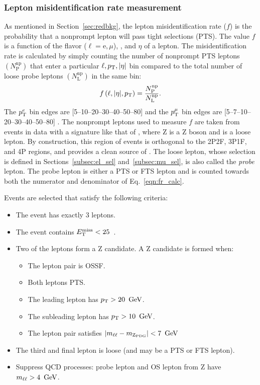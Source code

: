 \subsubsection{Lepton misidentification rate measurement}
\label{subsubsec:fr_evtsel}
As mentioned in Section~\ref{sec:redbkg}, the lepton misidentification rate ($f$) is the probability that a nonprompt lepton will pass tight selections (PTS).
The value $f$ is a function of the flavor ($\ell = \mathrm{e}, \mu$), \pt, and $\eta$ of a lepton.
The misidentification rate is calculated by simply counting the number of nonprompt PTS leptons $\left( N^{\mathrm{np}}_{\mathrm{P}} \right)$ that enter a particular $\ell, p_{\mathrm{T}}, \lvert \eta \rvert$ bin compared to the total number of loose probe leptons $\left( N^{\mathrm{np}}_{\mathrm{L}} \right)$ in the same bin:
\begin{equation}
	\label{eqn:fr_calc}
	f\left( \ell, \lvert \eta \rvert, p_{\mathrm{T}} \right) = 
	\frac{
		N^{\mathrm{np}}_{\mathrm{P}}
		}{
		N^{\mathrm{np}}_{\mathrm{L}}
		}.
\end{equation}
The $p_{\mathrm{T}}^e$ bin edges are [5--10--20--30--40--50--80] \GeV and the $p_{\mathrm{T}}^{\mu}$ bin edges are [5--7--10--20--30--40--50--80] \GeV.
The nonprompt leptons used to measure $f$ are taken from events in data with a signature like that of \ZplusL, where Z is a Z boson and \looselep is a loose lepton.
By construction, this region of events is orthogonal to the 2P2F, 3P1F, and 4P regions, and provides a clean source of \looselep.
The loose lepton, whose selection is defined in Sections~\ref{subsec:el_sel} and~\ref{subsec:mu_sel}, is also called the \emph{probe} lepton.
The probe lepton is either a PTS or FTS lepton and is counted towards both the numerator and denominator of Eq.~\ref{eqn:fr_calc}. 

Events are selected that satisfy the following criteria:
\begin{itemize}
	\item The event has exactly 3 leptons.
	\item The event contains $E_{\mathrm{T}}^{\text{miss}} < 25$~\GeV.
	\item Two of the leptons form a Z candidate. A Z candidate is formed when:
	\begin{itemize}
		\item The lepton pair is OSSF.
		\item Both leptons PTS.
		\item The leading lepton has $p_{\mathrm{T}} > 20~\,\text{Ge\hspace{-.08em}V}$.
		\item The subleading lepton has $p_{\mathrm{T}} > 10~\,\text{Ge\hspace{-.08em}V}$.
		\item The lepton pair satisfies $\left| m_{\ell\ell} - m_{\mathrm{Z}_{\text{PDG}}} \right| < 7~\,\text{Ge\hspace{-.08em}V}$
	\end{itemize}
	\item The third and final lepton is loose (and may be a PTS or FTS lepton).
	\item Suppress QCD processes: probe lepton and OS lepton from Z have $m_{\ell\ell} > 4~\,\text{Ge\hspace{-.08em}V}$.
\end{itemize}

